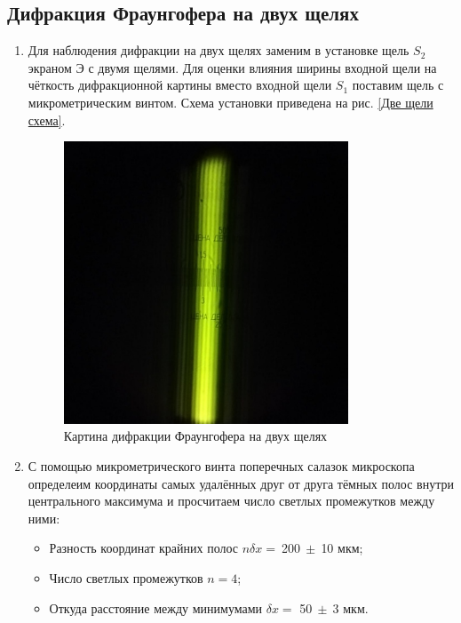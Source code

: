 \documentclass[a4paper, 12pt]{article}
\begin{document}
\subsection{Дифракция Фраунгофера на двух щелях}

\begin{enumerate}
	\item Для наблюдения дифракции на двух щелях заменим в установке щель $S_2$ экраном Э с двумя щелями. Для оценки влияния ширины входной щели на чёткость дифракционной картины вместо входной щели $S_1$ поставим щель с микрометрическим винтом. Схема установки приведена на рис. \ref{Две щели схема}.

	\begin{figure}[h!]
		\centering
		\includegraphics[width=0.8\textwidth]{Fraungofer_two_slots.jpg}
		\caption{Картина дифракции Фраунгофера на двух щелях}
	\end{figure}

	\item С помощью микрометрического винта поперечных салазок микроскопа определеим координаты самых удалённых друг от друга тёмных полос внутри центрального максимума и просчитаем число светлых промежутков между ними:

	\begin{itemize}
		\item Разность координат крайних полос $n \delta x =~$200$~\pm~$10 мкм;
		\item Число светлых промежутков $n = 4$;
		\item Откуда расстояние между минимумами $\delta x =$ 50$~\pm~$3 мкм.
	\end{itemize}


\end{enumerate}
\end{document}
